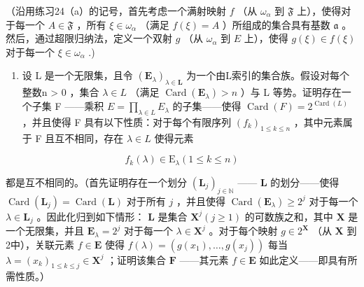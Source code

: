 （沿用练习24（a）的记号，首先考虑一个满射映射 \(f\) （从 \(\omega_{\alpha}\) 到 \(\mathfrak{F}\) 上），使得对于每一个 \(A \in \mathfrak{F}\) ，所有 \(\xi \in \omega_{\alpha}\) （满足 \(f(\xi) = A\) ）所组成的集合具有基数 \(\mathfrak{a}\) 。然后，通过超限归纳法，定义一个双射 \(g\) （从 \(\omega_{\alpha}\) 到 \(E\) 上），使得 \(g(\xi) \in f(\xi)\) 对于每一个 \(\xi \in \omega_{\alpha}\) .)

\begin{enumerate}
\def\labelenumi{\arabic{enumi}.}
\setcounter{enumi}{26}
\tightlist
\item
  设 L 是一个无限集，且令 \((\mathbf{E}_{\lambda})_{\lambda \in \mathbf{L}}\) 为一个由L索引的集合族。假设对每个整数n \textgreater{} 0 ，集合 \(\lambda \in L\) （满足 \(\operatorname{Card}(\mathbf{E}_{\lambda}) > n\) ）与 L 等势。证明存在一个子集 F ——乘积 \(E = \prod_{\lambda \in L} E_{\lambda}\) 的子集——使得 \(\operatorname{Card}(F) = 2^{\operatorname{Card}(L)}\) ，并且使得 F 具有以下性质：对于每个有限序列 \((f_k)_{1 \leqslant k \leqslant n}\) ，其中元素属于 F 且互不相同，存在 \(\lambda \in L\) 使得元素
\end{enumerate}

\[
f _ {k} (\lambda) \in \mathrm{E} _ {\lambda} (1 \leqslant k \leqslant n)
\]

都是互不相同的。（首先证明存在一个划分 \((\mathbf{L}_j)_{j \in \mathbb{N}}\) —— \(\mathbf{L}\) 的划分——使得 \(\operatorname{Card}(\mathbf{L}_j) = \operatorname{Card}(\mathbf{L})\) 对于所有 \(j\) ，并且使得 \(\operatorname{Card}(\mathbf{E}_{\lambda}) \geqslant 2^j\) 对于每一个 \(\lambda \in \mathbf{L}_j\) 。因此化归到如下情形： \(\mathbf{L}\) 是集合 \(\mathbf{X}^j (j \geqslant 1)\) 的可数族之和，其中 \(\mathbf{X}\) 是一个无限集，并且 \(\mathbf{E}_{\lambda} = 2^j\) 对于每一个 \(\lambda \in \mathbf{X}^j\) 。对于每个映射 \(g \in 2^{\mathbf{X}}\) （从 \(\mathbf{X}\) 到2中），关联元素 \(f \in \mathbf{E}\) 使得 \(f(\lambda) = (g(x_1), \ldots, g(x_j))\) 每当 \(\lambda = (x_k)_{1 \leqslant k \leqslant j} \in \mathbf{X}^j\) ；证明该集合 \(\mathbf{F}\) ——其元素 \(f \in \mathbf{E}\) 如此定义——即具有所需性质。）

